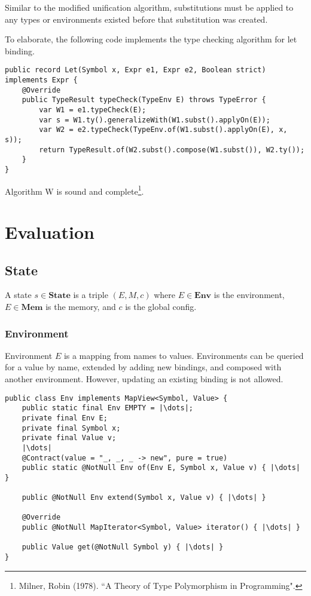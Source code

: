 \documentclass[a4paper]{article}
\begin{document}
Similar to the modified unification algorithm, substitutions must be applied to any types or environments existed before that substitution was created.

To elaborate, the following code implements the type checking algorithm for let binding.

\begin{verbatim}
public record Let(Symbol x, Expr e1, Expr e2, Boolean strict) implements Expr {
    @Override
    public TypeResult typeCheck(TypeEnv E) throws TypeError {
        var W1 = e1.typeCheck(E);
        var s = W1.ty().generalizeWith(W1.subst().applyOn(E));
        var W2 = e2.typeCheck(TypeEnv.of(W1.subst().applyOn(E), x, s));
        return TypeResult.of(W2.subst().compose(W1.subst()), W2.ty());
    }
}
\end{verbatim}

Algorithm W is sound and complete\footnote{Milner, Robin (1978). ``A Theory of Type Polymorphism in Programming".}.

\section{Evaluation}

\subsection{State}

A state $s \in \textbf{State}$ is a triple $(E, M, c)$ where $E \in \textbf{Env}$ is the environment, $E \in \textbf{Mem}$ is the memory, and $c$ is the global config.

\subsubsection{Environment}

Environment $E$ is a mapping from names to values. Environments can be queried for a value by name, extended by adding new bindings, and composed with another environment. However, updating an existing binding is not allowed.

\begin{verbatim}
public class Env implements MapView<Symbol, Value> {
    public static final Env EMPTY = |\dots|;
    private final Env E;
    private final Symbol x;
    private final Value v;
    |\dots|
    @Contract(value = "_, _, _ -> new", pure = true)
    public static @NotNull Env of(Env E, Symbol x, Value v) { |\dots| }

    public @NotNull Env extend(Symbol x, Value v) { |\dots| }

    @Override
    public @NotNull MapIterator<Symbol, Value> iterator() { |\dots| }

    public Value get(@NotNull Symbol y) { |\dots| }
}
\end{verbatim}
\end{document}
